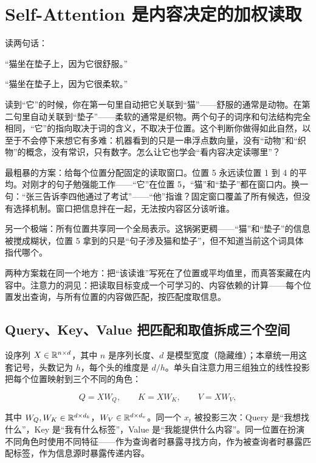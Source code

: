 \section{Self-Attention 是内容决定的加权读取}
\label{sec:14-Deep-Learning/05-Attention-and-Sequence-Models/01}

读两句话：

\begin{center}
``猫坐在垫子上，因为它很舒服。''
\end{center}

\begin{center}
``猫坐在垫子上，因为它很柔软。''
\end{center}

读到``它''的时候，你在第一句里自动把它关联到``猫''——舒服的通常是动物。在第二句里自动关联到``垫子''——柔软的通常是织物。两个句子的词序和句法结构完全相同，``它''的指向取决于词的含义，不取决于位置。这个判断你做得如此自然，以至于不会停下来想它有多难：机器看到的只是一串浮点数向量，没有``动物''和``织物''的概念，没有常识，只有数字。怎么让它也学会``看内容决定读哪里''？

最粗暴的方案：给每个位置分配固定的读取窗口。位置 5 永远读位置 1 到 4 的平均。对刚才的句子勉强能工作——``它''在位置 5，``猫''和``垫子''都在窗口内。换一句：``张三告诉李四他通过了考试''——``他''指谁？固定窗口覆盖了所有候选，但没有选择机制。窗口把信息拌在一起，无法按内容区分该听谁。

另一个极端：所有位置共享同一个全局表示。这锅粥更稠——``猫''和``垫子''的信息被搅成糊状，位置 5 拿到的只是``句子涉及猫和垫子''，但不知道当前这个词具体指代哪个。

两种方案栽在同一个地方：把``该读谁''写死在了位置或平均值里，而真答案藏在内容中。注意力的洞见：把读取目标变成一个可学习的、内容依赖的计算——每个位置发出查询，与所有位置的内容做匹配，按匹配度取信息。

\subsection{Query、Key、Value 把匹配和取值拆成三个空间}

设序列 \(X\in\mathbb{R}^{n\times d}\)，其中 \(n\) 是序列长度、\(d\) 是模型宽度（隐藏维）；本章统一用这套记号，头数记为 \(h\)，每个头的维度是 \(d/h\)。单头自注意力用三组独立的线性投影把每个位置映射到三个不同的角色：

\[
Q = XW_Q,\qquad K = XW_K,\qquad V = XW_V,
\]

其中 \(W_Q,W_K\in\mathbb{R}^{d\times d_k}\)，\(W_V\in\mathbb{R}^{d\times d_v}\)。同一个 \(x_t\) 被投影三次：Query 是``我想找什么''，Key 是``我有什么标签''，Value 是``我能提供什么内容''。同一位置在扮演不同角色时使用不同特征——作为查询者时暴露寻找方向，作为被查询者时暴露匹配标签，作为信息源时暴露传递内容。

